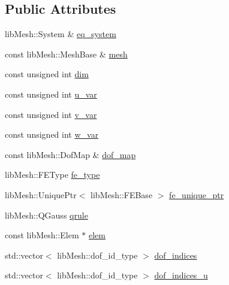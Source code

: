 \subsection*{Public Attributes}
\begin{DoxyCompactItemize}
\item 
lib\+Mesh\+::\+System \& \hyperlink{classcarl_1_1lib_mesh__fe__addresses__3_a00a369a85085d3ea80f41a80f9240cd2}{eq\+\_\+system}
\item 
const lib\+Mesh\+::\+Mesh\+Base \& \hyperlink{classcarl_1_1lib_mesh__fe__addresses__3_a4b98976e0abb51da524d0750bfcaa313}{mesh}
\item 
const unsigned int \hyperlink{classcarl_1_1lib_mesh__fe__addresses__3_a5f5ce3cc4f0ac44cf0ec4455928422e6}{dim}
\item 
const unsigned int \hyperlink{classcarl_1_1lib_mesh__fe__addresses__3_a66548903d66794e618d176376e101636}{u\+\_\+var}
\item 
const unsigned int \hyperlink{classcarl_1_1lib_mesh__fe__addresses__3_a9968e0844a5f7881b357a43f9c80d271}{v\+\_\+var}
\item 
const unsigned int \hyperlink{classcarl_1_1lib_mesh__fe__addresses__3_ac20af6d63174a015605348bd0cf83f1c}{w\+\_\+var}
\item 
const lib\+Mesh\+::\+Dof\+Map \& \hyperlink{classcarl_1_1lib_mesh__fe__addresses__3_a08da73b64b37fc9b3059924591db2948}{dof\+\_\+map}
\item 
lib\+Mesh\+::\+F\+E\+Type \hyperlink{classcarl_1_1lib_mesh__fe__addresses__3_a1e846af08149d7e65adad645e402d086}{fe\+\_\+type}
\item 
lib\+Mesh\+::\+Unique\+Ptr$<$ lib\+Mesh\+::\+F\+E\+Base $>$ \hyperlink{classcarl_1_1lib_mesh__fe__addresses__3_ae1c6278181a94410966bf313f2ecabe2}{fe\+\_\+unique\+\_\+ptr}
\item 
lib\+Mesh\+::\+Q\+Gauss \hyperlink{classcarl_1_1lib_mesh__fe__addresses__3_ab65bb9f83a2b413504d666ad68544fa6}{qrule}
\item 
const lib\+Mesh\+::\+Elem $\ast$ \hyperlink{classcarl_1_1lib_mesh__fe__addresses__3_ae605a2361e42cf2dd2ef8103143060b1}{elem}
\item 
std\+::vector$<$ lib\+Mesh\+::dof\+\_\+id\+\_\+type $>$ \hyperlink{classcarl_1_1lib_mesh__fe__addresses__3_a124437d3ae6b57b70beb1fc110d72e96}{dof\+\_\+indices}
\item 
std\+::vector$<$ lib\+Mesh\+::dof\+\_\+id\+\_\+type $>$ \hyperlink{classcarl_1_1lib_mesh__fe__addresses__3_a0b5abe23e90121a4b73076ee30ff0864}{dof\+\_\+indices\+\_\+u}
\item 

\end{DoxyCompactItemize}
